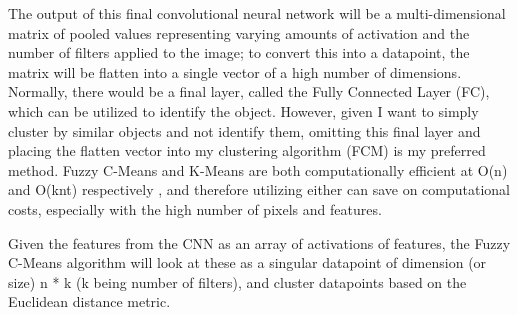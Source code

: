 \documentclass[10pt,twocolumn]{article}
\begin{document}
The output of this final convolutional neural network will be a multi-dimensional matrix of pooled values representing varying amounts of activation \cite{Arc2018} and the number of filters applied to the image; to convert this into a datapoint, the matrix will be flatten into a single vector of a high number of dimensions. Normally, there would be a final layer, called the Fully Connected Layer (FC), which can be utilized to identify the object. However, given I want to simply cluster by similar objects and not identify them, omitting this final layer and placing the flatten vector into my clustering algorithm (FCM) is my preferred method. Fuzzy C-Means and K-Means are both computationally efficient at O(n) and O(knt) respectively \cite{Mittal2021}, and therefore utilizing either can save on computational costs, especially with the high number of pixels and features. 

Given the features from the CNN as an array of activations of features, the Fuzzy C-Means algorithm will look at these as a singular datapoint of dimension (or size) n * k (k being number of filters), and cluster datapoints based on the Euclidean distance metric. 



	
	
\end{document}
